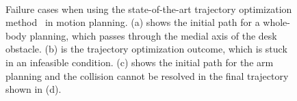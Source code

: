 \documentclass[letterpaper, 10 pt, conference]{ieeeconf}  %
\begin{document}
\begin{figure}[t]
\centering
{}
 \\
\caption{Failure cases when using the state-of-the-art trajectory optimization method~\cite{Schulman:2013:FLO} in motion planning. (a) shows the initial path for a whole-body planning, which passes through the medial axis of the desk obstacle. (b) is the trajectory optimization outcome, which is stuck in an infeasible condition. (c) shows the initial path for the arm planning and the collision cannot be resolved in the final trajectory shown in (d). }
\label{fig:failexamples}
\end{figure}
\end{document}
